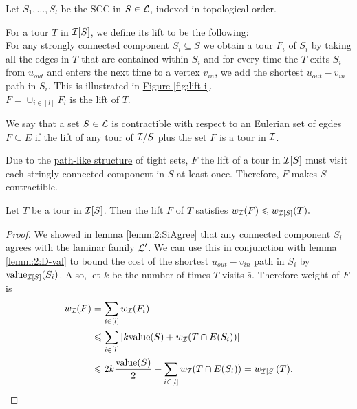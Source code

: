 \documentclass[./main.tex]{subfiles}
\begin{document}
	
	Let $S_1, \dots, S_l$ be the SCC in $S \in \mathcal{L}$, indexed in topological order.
	\begin{definition}\label{def:3:indu-lift}
		For a tour $T$ in $\mathcal{I}[S]$, we define its lift to be the following:\\
		For any strongly connected component $S_i \subseteq S$ we obtain a tour $F_i$ of $S_i$ by taking all the edges in $T$ that are contained within $S_i$ and for every time the $T$ exits $S_i$ from $u_{out}$ and enters the next time to a vertex $v_{in}$, we add the shortest $u_{out} - v_{in}$ path in $S_i$. 
		This is illustrated in \hyperref[fig:lift-i]{Figure \ref{fig:lift-i}}.\\
		$F = \cup_{i \in [l]} F_i$ is the lift of $T$.\\
	\end{definition}
	
	
	\begin{definition}
		We say that a set $S \in \mathcal{L}$ is contractible with respect to an Eulerian set of egdes $F \subseteq E$ if the lift of any tour of $\mathcal{I}/S$ plus the set $F$ is a tour in $\mathcal{I}$.\\
	\end{definition}
	
	Due to the \hyperref[fig:tightPath]{path-like structure} of tight sets, $F$ the lift of a tour in $\mathcal{I}[S]$ must visit each stringly connected component in $S$ at least once. Therefore, $F$ makes $S$ contractible.\\
		
	\begin{lemma}\label{lemm:3:lift-i}
		Let $T$ be a tour in $\mathcal{I}[S]$. Then the lift $F$ of $T$ satisfies $w_{\mathcal{I}}(F) \leqslant w_{\mathcal{I}[S]}(T).$
	\end{lemma}
	\begin{proof}
		We showed in \hyperref[lemm:2:SiAgree]{lemma \ref{lemm:2:SiAgree}} that any connected component $S_i$ agrees with the laminar family $\mathcal{L}'$. We can use this in conjunction with \hyperref[lemm:2:D-val]{lemma \ref{lemm:2:D-val}} to bound the cost of the shortest $u_{out} - v_{in}$ path in $S_i$ by $\textup{value}_{\mathcal{I}[S]}(S_i)$. Also, let $k$ be the number of times $T$ visits $\bar{s}$. Therefore weight of $F$ is
		\begin{align*}
			w_{\mathcal{I}}(F) &= \sum_{i \in [l]} w_{\mathcal{I}}(F_i)\\
			&\leqslant \sum_{i \in [l]} \left[k\textup{value}(S) + w_{\mathcal{I}}(T \cap E(S_i))\right]\\
			&\leqslant 2k \frac{\textup{value}(S)}{2} + \sum_{i \in [l]}w_{\mathcal{I}}(T \cap E(S_i)) = w_{\mathcal{I}[S]}(T).
		\end{align*}
	\end{proof}
\end{document}

